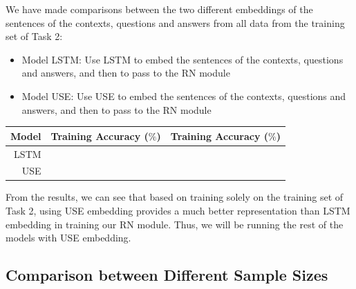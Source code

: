 \documentclass{article}
\begin{document}
 

 

We have made comparisons between the two different embeddings of the sentences of the contexts, questions and answers from all data from the training set of Task 2:

 

\begin{itemize}

\item Model LSTM: Use LSTM to embed the sentences of the contexts, questions and answers, and then to pass to the RN module

\item Model USE: Use USE to embed the sentences of the contexts, questions and answers, and then to pass to the RN module

\end{itemize}

 

\begin{center}

\begin{tabular}{|r|r|r|}

 

\hline

\textbf{Model}&\textbf{Training Accuracy ($\%$)}&\textbf{Training Accuracy ($\%$)}\\

\hline

LSTM & &\\

\hline

USE & & \\

\hline

 

\end{tabular}

\end{center}

 

From the results, we can see that based on training solely on the training set of Task 2, using USE embedding provides a much better representation than LSTM embedding in training our RN module. Thus, we will be running the rest of the models with USE embedding.

 

 

\subsection{Comparison between Different Sample Sizes}
\end{document}
